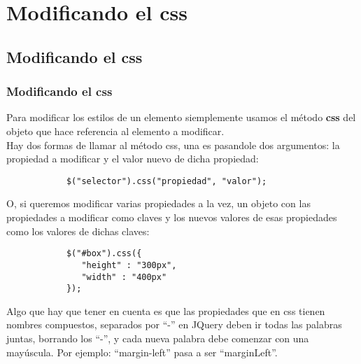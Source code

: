\documentclass[10pt]{beamer}
\begin{document}
\section{Modificando el css}
\subsection{Modificando el css}
\begin{frame}[fragile]
	\frametitle{Modificando el css}
	
	\pause Para modificar los estilos de un elemento siemplemente usamos el método \textbf{css} del objeto que
		hace referencia al elemento a modificar. \\
		
	\pause Hay dos formas de llamar al método css, una es pasandole dos argumentos: la propiedad a modificar
		y el valor nuevo de dicha propiedad:
	\pause \begin{lstlisting}
			$("selector").css("propiedad", "valor");
		\end{lstlisting}
		
	\pause O, si queremos modificar varias propiedades a la vez, un objeto con las propiedades a modificar como
		claves y los nuevos valores de esas propiedades como los valores de dichas claves:
	\pause \begin{lstlisting}
			$("#box").css({
			   "height" : "300px",
			   "width" : "400px"
			});
		\end{lstlisting}
	
	\pause Algo que hay que tener en cuenta es que las propiedades que en css tienen nombres compuestos, separados
		por ``-'' en JQuery deben ir todas las palabras juntas, borrando los ``-'', y cada nueva palabra debe comenzar
		con una mayúscula. Por ejemplo: ``margin-left'' pasa a ser ``marginLeft''.
\end{frame}
\end{document}
